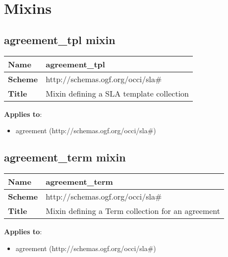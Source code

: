 \documentclass{article}
\begin{document}
\section{Mixins}
\subsection{agreement\_tpl mixin}
\begin{center}
\begin{tabular}{|l|l|}
  \hline
  \textbf{Name} & agreement\_tpl \\
  \hline  
  \textbf{Scheme} & http://schemas.ogf.org/occi/sla\# \\
  \hline
  \textbf{Title} & Mixin defining a SLA template collection \\
  \hline
\end{tabular}
\end{center}
\textbf{Applies to}:
\begin{itemize}
	\item agreement (http://schemas.ogf.org/occi/sla\#)
\end{itemize}



\subsection{agreement\_term mixin}
\begin{center}
\begin{tabular}{|l|l|}
  \hline
  \textbf{Name} & agreement\_term \\
  \hline  
  \textbf{Scheme} & http://schemas.ogf.org/occi/sla\# \\
  \hline
  \textbf{Title} & Mixin defining a Term collection for an agreement \\
  \hline
\end{tabular}
\end{center}
\textbf{Applies to}:
\begin{itemize}
	\item agreement (http://schemas.ogf.org/occi/sla\#)
\end{itemize}
\end{document}
